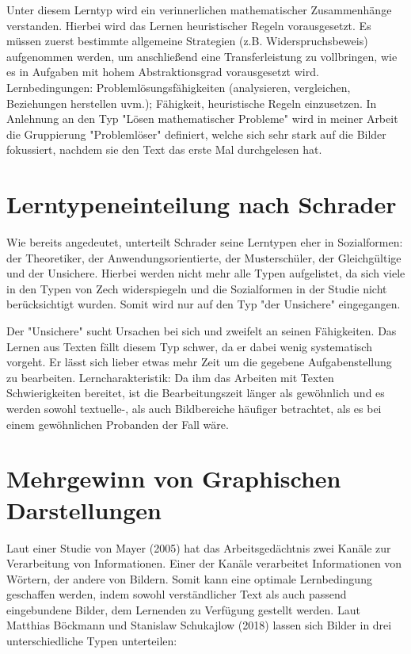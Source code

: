 Unter diesem Lerntyp wird ein verinnerlichen mathematischer Zusammenhänge verstanden. Hierbei wird das Lernen heuristischer Regeln vorausgesetzt. Es müssen zuerst bestimmte allgemeine Strategien (z.B. Widerspruchsbeweis) aufgenommen werden, um anschließend eine Transferleistung zu vollbringen, wie es in Aufgaben mit hohem Abstraktionsgrad vorausgesetzt wird. 
Lernbedingungen: Problemlösungsfähigkeiten (analysieren, vergleichen, Beziehungen herstellen uvm.); Fähigkeit, heuristische Regeln einzusetzen.
In Anlehnung an den Typ "Lösen mathematischer Probleme" wird in meiner Arbeit die Gruppierung "Problemlöser" definiert, welche sich sehr stark auf die Bilder fokussiert, nachdem sie den Text das erste Mal durchgelesen hat\cite{zech1983grundkurs}.

\section{Lerntypeneinteilung nach Schrader}

Wie bereits angedeutet, unterteilt Schrader seine Lerntypen eher in Sozialformen: der Theoretiker, der Anwendungsorientierte, der Musterschüler, der Gleichgültige und der Unsichere. Hierbei werden nicht mehr alle Typen aufgelistet, da sich viele in den Typen von Zech widerspiegeln und die Sozialformen in der Studie nicht berücksichtigt wurden. Somit wird nur auf den Typ "der Unsichere" eingegangen.

Der "Unsichere" sucht Ursachen bei sich und zweifelt an seinen Fähigkeiten. Das Lernen aus Texten fällt diesem Typ schwer, da er dabei wenig systematisch vorgeht. Er lässt sich lieber etwas mehr Zeit um die gegebene Aufgabenstellung zu bearbeiten.
Lerncharakteristik: Da ihm das Arbeiten mit Texten Schwierigkeiten bereitet, ist die Bearbeitungszeit länger als gewöhnlich und es werden sowohl textuelle-, als auch Bildbereiche häufiger betrachtet, als es bei einem gewöhnlichen Probanden der Fall wäre\cite{schrader2008lerntypen}. 

\section{Mehrgewinn von Graphischen Darstellungen}

Laut einer Studie von Mayer (2005) hat das Arbeitsgedächtnis zwei Kanäle zur Verarbeitung von Informationen. Einer der Kanäle verarbeitet Informationen von Wörtern, der andere von Bildern\cite{mayer2005reliability}. Somit kann eine optimale Lernbedingung geschaffen werden, indem sowohl verständlicher Text als auch passend eingebundene Bilder, dem Lernenden zu Verfügung gestellt werden. Laut Matthias Böckmann und Stanislaw Schukajlow (2018) lassen sich Bilder in drei unterschiedliche Typen unterteilen:
    
